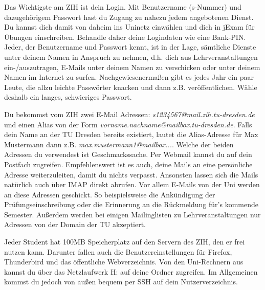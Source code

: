 

Das Wichtigste am ZIH ist dein Login.
Mit Benutzername (s-Nummer) und dazugehörigem Passwort hast du Zugang zu nahezu jedem angebotenen Dienst.
Du kannst dich damit von daheim ins Uninetz einwählen und dich in jExam für Übungen einschreiben.
Behandle daher deine Logindaten wie eine Bank-PIN.
Jeder, der Benutzername und Passwort kennt, ist in der Lage, sämtliche Dienste unter deinem Namen in Anspruch zu nehmen, d.h. dich aus Lehrveranstaltungen ein-/auszutragen, E-Mails unter deinem Namen zu verschicken oder unter deinem Namen im Internet zu surfen.
Nachgewiesenermaßen gibt es jedes Jahr ein paar Leute, die allzu leichte Passwörter knacken und dann z.B. veröffentlichen.
Wähle deshalb ein langes, schwieriges Passwort.

Du bekommst vom ZIH zwei E-Mail Adressen:
\textit{s1234567@mail.zih.tu-dresden.de} und einen Alias von der Form \textit{vorname.nachname@mailbox.tu-dresden.de}.
Falls dein Name an der TU Dresden bereits existiert, lautet die Alias-Adresse für Max Mustermann dann z.B. \textit{max.mustermann1@mailbox...}.
Welche der beiden Adressen du verwendest ist Geschmackssache.
Per Webmail kannst du auf dein Postfach zugreifen.
Empfehlenswert ist es auch, deine Mails an eine persönliche Adresse weiterzuleiten, damit du nichts verpasst.
Ansonsten lassen sich die Mails natürlich auch über IMAP direkt abrufen.
Vor allem E-Mails von der Uni werden an diese Adressen geschickt.
So beispielsweise die Ankündigung der Prüfungseinschreibung oder die Erinnerung an die Rückmeldung für's kommende Semester.
Außerdem werden bei einigen Mailinglisten zu Lehrveranstaltungen nur Adressen von der Domain der TU akzeptiert.

Jeder Student hat 100MB Speicherplatz auf den Servern des ZIH, den er frei nutzen kann.
Darunter fallen auch die Benutzereinstellungen für Firefox, Thunderbird und das öffentliche Webverzeichnis.
Von den Uni-Rechnern aus kannst du über das Netzlaufwerk H: auf deine Ordner zugreifen.
Im Allgemeinen kommst du jedoch von außen bequem per SSH auf dein Nutzerverzeichnis.

